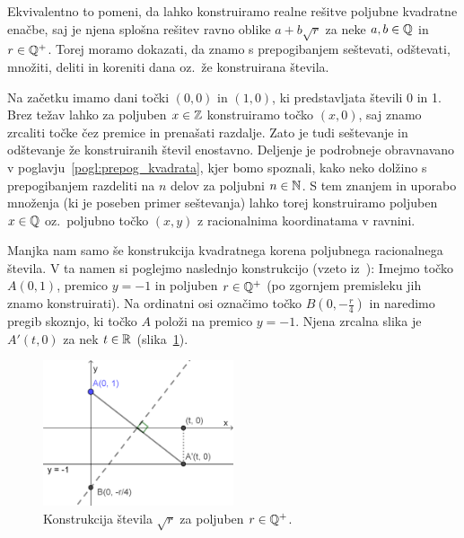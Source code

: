 \begin{dokaz}
    Ekvivalentno to pomeni, da lahko konstruiramo realne rešitve poljubne kvadratne enačbe, saj je njena splošna rešitev ravno oblike $a + b\sqrt{r} $ za neke $ a, b \in \mathbb Q$ in $r \in \mathbb Q^{+}$. Torej moramo dokazati, da znamo s prepogibanjem seštevati, odštevati, množiti, deliti in koreniti dana oz.\ že konstruirana števila.
    
    Na začetku imamo dani točki $(0, 0)$ in $(1, 0)$, ki predstavljata števili 0 in 1. Brez težav lahko za poljuben $x \in \mathbb Z$ konstruiramo točko $(x, 0)$, saj znamo zrcaliti točke čez premice in prenašati razdalje. Zato je tudi seštevanje in odštevanje že konstruiranih števil enostavno. Deljenje je podrobneje obravnavano v poglavju~\ref{pogl:prepog_kvadrata}, kjer bomo spoznali, kako neko dolžino s prepogibanjem razdeliti na $n$ delov za poljubni $n \in \mathbb N$. S tem znanjem in uporabo množenja (ki je poseben primer seštevanja) lahko torej konstruiramo poljuben $x \in \mathbb Q$ oz.\ poljubno točko $(x, y)$ z racionalnima koordinatama v ravnini.
    
    Manjka nam samo še konstrukcija kvadratnega korena poljubnega racionalnega števila. V ta namen si poglejmo naslednjo konstrukcijo (vzeto iz~\cite[str.\ 58]{hull2013}):
    Imejmo točko $A (0, 1) $, premico $y = -1$ in poljuben $r \in \mathbb Q^{+}$ (po zgornjem premisleku jih znamo konstruirati). Na ordinatni osi označimo točko $B (0, -\frac{r}{4})$ in naredimo pregib skoznjo, ki točko $A$ položi na premico $y = -1$. Njena zrcalna slika je $A' (t, 0) $ za nek $t \in \mathbb R$ (slika~\ref{fig:konstrukcija_korena}).
    
    \begin{figure}[h]
        \centering
        \includegraphics[width=0.5\textwidth]{images/kvadratni_koren.png}
        \caption[Konstrukcija korena]{Konstrukcija števila $\sqrt{r}$ za poljuben $r \in \mathbb Q^{+}$.}
        \label{fig:konstrukcija_korena}
    \end{figure}
    

\end{dokaz}
